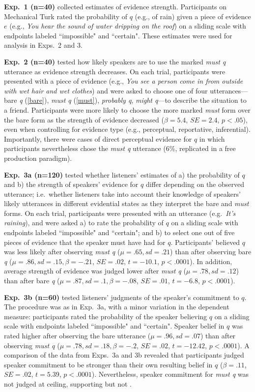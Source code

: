 \documentclass[11pt]{article}
\begin{document}
\textbf{Exp.~1 (n=40)} collected estimates of evidence strength. Participants on Mechanical Turk rated the probability of $q$ (e.g., of rain) given a piece of evidence $e$ (e.g., \emph{You hear the sound of water dripping on the roof}) on a sliding scale with endpoints labeled ``impossible" and ``certain". These estimates were used for analysis in Exps.~2 and 3.

\textbf{Exp.~2 (n=40)} tested how likely speakers are to use the marked \emph{must q} utterance as evidence strength decreases. On each trial, participants were presented with a piece of evidence (e.g., \emph{You see a person come in from outside with wet hair and wet clothes}) and were asked to choose one of four utterances---bare \emph{q} (\ref{bare}), \emph{must q} (\ref{must}), \emph{probably q}, \emph{might q}---to describe the situation to a friend. Participants were more likely to choose the more marked \emph{must} form over the bare form as the strength of evidence decreased ($\beta=5.4$, $SE=2.4$, $p<.05$), even when controlling for evidence type (e.g., perceptual, reportative, inferential). Importantly, there were cases of direct perceptual evidence for $q$ in which participants nevertheless chose the \emph{must q} utterance (6\%, replicated in a free production paradigm).

\textbf{Exp.~3a (n=120)} tested whether listeners' estimates of a) the probability of $q$ and b) the strength of speakers' evidence for $q$ differ depending on the observed utterance; i.e.~whether listeners take into account their knowledge of speakers' likely utterances in different evidential states as they interpret the bare and \emph{must} forms. On each trial, participants were presented with an utterance (e.g.~\emph{It's raining}), and were asked a) to rate the probability of $q$ on a sliding scale with endpoints labeled ``impossible" and ``certain"; and b) to select one out of five pieces of evidence that the speaker must have had for $q$. Participants' believed $q$ was less likely after observing  \emph{must q} ($\mu=.65,sd=.21$) than after observing bare \emph{q} ($\mu=.86,sd=.15, \beta=-.21$, $SE=.02$, $t=-10.1$, $p<.0001$). In addition, average strength of evidence was judged lower after \emph{must q} ($\mu=.78,sd=.12$) than after bare \emph{q} ($\mu=.87,sd=.1, \beta=-.08$, $SE=.01$, $t=-6.8$, $p<.0001$).

\textbf{Exp.~3b (n=60)} tested listeners' judgments of the speaker's commitment to $q$. The procedure was as in Exp.~3a, with a minor variation in the dependent measure: participants  rated the probability of the speaker believing $q$ on a sliding scale with endpoints labeled ``impossible" and ``certain". Speaker belief in $q$ was rated higher after observing the bare utterance ($\mu=.96,sd=.07$) than after observing  \emph{must q}  ($\mu=.78,sd=.18, \beta=-.2$, $SE=.02$, $t=-12.42$, $p<.0001$). A comparison of the data from Exps.~3a and 3b revealed that participants judged speaker commitment to be stronger than their own resulting belief in $q$ ($\beta=.11$, $SE=.02$, $t=5.39$, $p<.0001$). Nevertheless, speaker commitment for \emph{must q} was not judged at ceiling, supporting \citep{lassiter2014salt} but not \citep{vonfintelgillies2010}.
\end{document}
